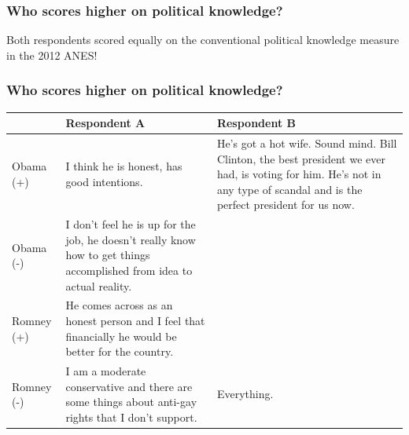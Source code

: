\documentclass{beamer}
\begin{document}
\begin{frame}%
\frametitle{Who scores higher on political knowledge?}
\begin{center}
\large{Both respondents scored equally on the conventional political knowledge measure in the 2012 ANES!}
\end{center}
\end{frame}

\begin{frame}%
\frametitle{Who scores higher on political knowledge?}
\begin{table}[ht]\footnotesize\centering
\begin{tabular}{l|p{4.5cm}|p{4.5cm}}
   \toprule
    & \textbf{Respondent A} & \textbf{Respondent B} \\ 
    \midrule
  Obama (+) & I think he is honest, has good intentions. & He's got a hot wife. Sound mind. Bill Clinton, the best president we ever had, is voting for him. He's not in any type of scandal and is the perfect president for us now. \\ \hdashline
  Obama (-) & I don't feel he is up for the job, he doesn't really know how to get things accomplished from idea to actual reality. &  \\ \hdashline
  Romney (+) & He comes across as an honest person and I feel that financially he would be better for the country. &  \\ \hdashline
  Romney (-) & I am a moderate conservative and there are some things about anti-gay rights that I don't support. & Everything. \\
    \bottomrule
 \end{tabular}
\end{table}
\end{frame}
\end{document}
